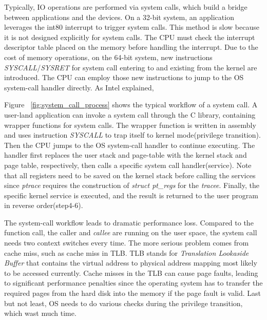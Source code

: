 Typically, IO operations are performed via system calls, 
which build a bridge between applications and the devices.  
 On a 32-bit system, an application leverages the int80 
interrupt to trigger system calls. This method is slow because it is not designed explicitly for system calls. 
The CPU must check the interrupt descriptor table placed on the memory before handling the interrupt. Due to
 the cost of memory operations, on the 64-bit system, new instructions \emph{SYSCALL}/\emph{SYSRET} for system 
 call entering to and existing from the kernel are introduced. The CPU can employ those new instructions to jump 
 to the OS system-call handler directly. As Intel explained, 

Figure ~\ref{fig:system_call_process} shows the typical workflow of a system call. 
A user-land application can invoke a system call through
the C library, containing wrapper functions for system calls. 
The wrapper function is written in assembly and uses instruction \emph{SYSCALL} to trap 
itself to kernel mode(privilege transition). Then the CPU jumps to the OS system-call handler to continue executing. 
The handler first replaces the user stack and page-table with the kernel 
stack and page table, respectively, then calls a specific system call handler(service). 
Note that all registers need to be saved on the kernel stack before calling the services since \emph{ptrace} 
requires the construction of \emph{struct pt\_regs} for the \emph{tracee}. 
Finally, the specific kernel service is executed, and the result is returned 
to the user program in reverse order(step4-6).

The system-call workflow leads to dramatic performance loss. 
Compared to the function call, the caller and \emph{callee} are running on the user space, 
the system call needs two context switches every time. The more serious problem comes from cache miss, such as 
cache miss in TLB. TLB stands for \emph{Translation Lookaside Buffer} that contains the virtual address to 
physical address mapping most likely to be accessed currently. Cache misses in the TLB can cause page faults, 
leading to significant performance penalties since the operating system has to transfer the required pages 
from the hard disk into the memory if the page fault is valid. Last but not least, OS needs to do various checks 
during the privilege transition, which wast much time.

